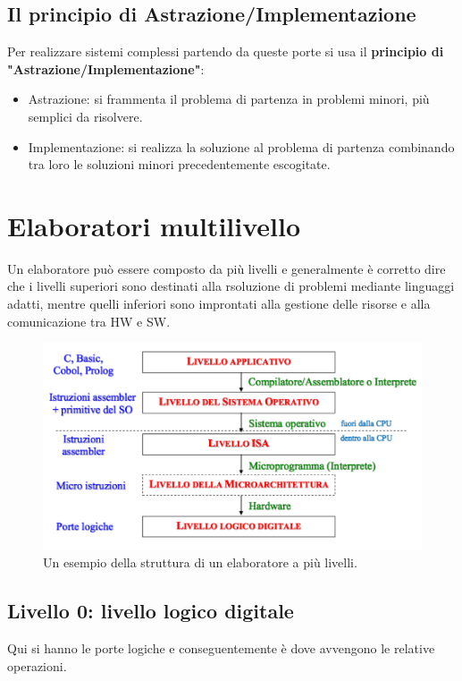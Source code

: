 \documentclass[12pt]{article}
\begin{document}
\subsection{Il principio di Astrazione/Implementazione}
Per realizzare sistemi complessi partendo da queste porte si usa il \textbf{principio di "Astrazione/Implementazione"}:
\begin{itemize} %
    \item Astrazione: si frammenta il problema di partenza in problemi minori, più semplici da risolvere.
    \item Implementazione: si realizza la soluzione al problema di partenza combinando tra loro le soluzioni minori precedentemente escogitate.
\end{itemize}
\section{Elaboratori multilivello}
Un elaboratore può essere composto da più livelli e generalmente è corretto dire che i livelli superiori sono destinati alla rsoluzione di problemi mediante linguaggi adatti, mentre quelli inferiori sono improntati alla gestione delle risorse e alla comunicazione tra HW e SW.\\
\begin{figure}[!htb]
    \centering
    \includegraphics[width=.9\linewidth,height=.40\textheight,keepaspectratio]{introduzione/struttura_multilivello.PNG} %
    \begin{center}
        \caption{\label{fig:multilevel_example}Un esempio della struttura di un elaboratore a più livelli.} %
    \end{center}
\end{figure}
\subsection{Livello 0: livello logico digitale}
Qui si hanno le porte logiche e conseguentemente è dove avvengono le relative operazioni.
\end{document}
